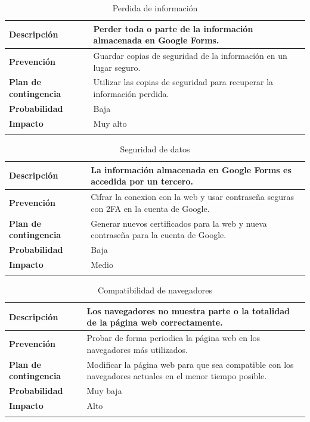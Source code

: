 \documentclass{report}
\begin{document}
        \begin{center}
            \begin{longtable}{|p{6cm}|p{6cm}|}
                \hline
                \textbf{Descripción} & Perder toda o parte de la información almacenada en Google Forms.\\
                \hline
                \textbf{Prevención} & Guardar copias de seguridad de la información en un lugar seguro.\\
                \hline
                \textbf{Plan de contingencia} & Utilizar las copias de seguridad para recuperar la información perdida.\\
                \hline
                \textbf{Probabilidad} & Baja\\
                \hline
                \textbf{Impacto} & Muy alto\\
                \hline
                \caption{Perdida de información}
            \end{longtable}
        \end{center}
        \begin{center}
            \begin{longtable}{|p{6cm}|p{6cm}|}
                \hline
                \textbf{Descripción} & La información almacenada en Google Forms es accedida por un tercero.\\
                \hline
                \textbf{Prevención} & Cifrar la conexion con la web y usar contraseña seguras con 2FA en la cuenta de Google.\\
                \hline
                \textbf{Plan de contingencia} & Generar nuevos certificados para la web y nueva contraseña para la cuenta de Google.\\
                \hline
                \textbf{Probabilidad} & Baja\\
                \hline
                \textbf{Impacto} & Medio\\
                \hline
                \caption{Seguridad de datos}
            \end{longtable}
        \end{center}
        \clearpage
        \begin{center}
            \begin{longtable}{|p{6cm}|p{6cm}|}
                \hline
                \textbf{Descripción} & Los navegadores no muestra parte o la totalidad de la página web correctamente.\\
                \hline
                \textbf{Prevención} & Probar de forma periodica la página web en los navegadores más utilizados.\\
                \hline
                \textbf{Plan de contingencia} & Modificar la página web para que sea compatible con los navegadores actuales en el menor tiempo posible.\\
                \hline
                \textbf{Probabilidad} & Muy baja\\
                \hline
                \textbf{Impacto} & Alto\\
                \hline
                \caption{Compatibilidad de navegadores}
            \end{longtable}
        \end{center}
\end{document}
